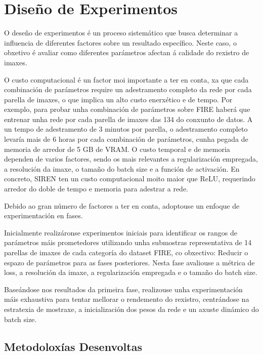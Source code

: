 \section{Diseño de Experimentos}
\label{sec:Diseño de Experimentos}

O deseño de experimentos é un proceso sistemático que busca determinar a influencia de diferentes factores sobre un resultado específico. Neste caso, o obxetivo é avaliar como diferentes parámetros afectan á calidade do rexistro de imaxes.

O custo computacional é un factor moi importante a ter en conta, xa que cada combinación de parámetros require un adestramento completo da rede por cada parella de imaxes, o que implica un alto custo enerxético e de tempo.
Por exemplo, para probar unha combinación de parámetros sobre FIRE haberá que entrenar unha rede por cada parella de imaxes das 134 do conxunto de datos. 
A un tempo de adestramento de 3 minutos por parella, o adestramento completo levaría mais de 6 horas por cada combinación de parámetros, cunha pegada de memoria de arredor de 5 GB de VRAM.
O custo temporal e de memoria dependen de varios factores, sendo os mais relevantes a regularización empregada, a resolución da imaxe, o tamaño do batch size e a función de activación.
En concreto, SIREN ten un custo computacional moito maior que ReLU, requerindo arredor do doble de tempo e memoria para adestrar a rede.

Debido ao gran número de factores a ter en conta, adoptouse un enfoque de experimentación en fases.

Inicialmente realizáronse experimentos iniciais para identificar os rangos de parámetros máis prometedores utilizando unha submostras representativa de 14 parellas de imaxes de cada categoría do dataset FIRE, co obxectivo: Reducir o espazo de parámetros para as fases posteriores.
Nesta fase avaliouse a métrica de loss, a resolución da imaxe, a regularización empregada e o tamaño do batch size.

Baseándose nos resultados da primeira fase, realizouse unha experimentación máis exhaustiva para tentar mellorar o rendemento do rexistro, centrándose na estratexia de mostraxe, a inicialización dos pesos da rede e un axuste dinámico do batch size.

\subsection{Metodoloxías Desenvoltas}
\label{subsec:Metodoloxías Desenvoltas}

